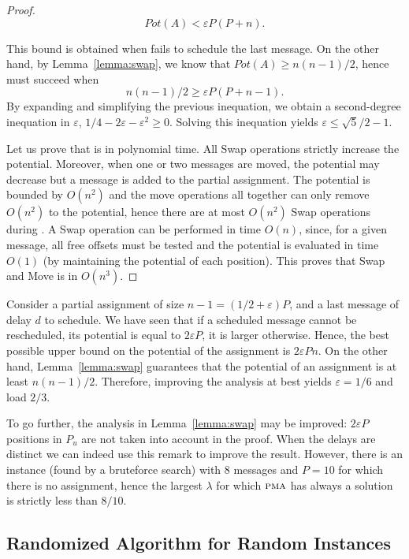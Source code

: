 \documentclass[pdflatex,sn-mathphys,iicol]{sn-jnl}%
\theoremstyle{thmstyleone}%
\theoremstyle{thmstyletwo}%
\theoremstyle{thmstylethree}%
\begin{document}
\begin{proof}
$$  Pot(A) < \varepsilon P (P + n).$$

This bound is obtained when \swapandmove fails to schedule the last message.
On the other hand, by Lemma~\ref{lemma:swap}, we know that $Pot(A) \geq n(n-1)/2$, hence 
\swapandmove must succeed when
$$n(n-1)/2 \geq  \varepsilon P (P + n -1).$$
By expanding and simplifying the previous inequation, we obtain a second-degree inequation in $\varepsilon$, $1/4 - 2\varepsilon - \varepsilon ^2 \geq  0$.
Solving this inequation yields $\varepsilon \leq \sqrt{5}/2 -1$.


Let us prove that \swapandmove is in polynomial time. All Swap operations 
strictly increase the potential. Moreover, when one or two messages are moved, the potential may decrease but a message is added to the partial assignment. The potential is bounded by $O(n^2)$ and the move operations all together can only remove $O(n^2)$ to the potential, hence there are at most $O(n^2)$ Swap operations during \swapandmove. A Swap operation can be performed in time $O(n)$, since, for a given message, all free offsets must be tested and the potential is evaluated in time $O(1)$ (by maintaining the potential of each position). This proves that Swap and Move is in $O(n^3)$.  
\end{proof}

Consider a partial assignment of size $n-1 = (1/2 + \varepsilon)P$, and a last message of delay $d$ to schedule.
We have seen that if a scheduled message cannot be rescheduled, its potential is equal to $2\varepsilon P$, it is larger otherwise.
Hence, the best possible upper bound on the potential of the assignment is $2\varepsilon P n$. On the other hand, Lemma~\ref{lemma:swap} guarantees that the potential of an assignment is at least $n(n-1)/2$. Therefore, improving the analysis at best yields $\varepsilon = 1/6$ and load $2/3$.

To go further, the analysis in Lemma~\ref{lemma:swap} may be improved: $2\varepsilon P$ positions in $P_{u}$ are not taken into account in the proof. When the delays are distinct we can indeed use this remark to improve the result. However, there is an instance (found by a bruteforce search) with $8$ messages and $P=10$ for which there is no assignment, hence the largest $\lambda$ for which $\textsc{pma}$ has always a solution is strictly less than $8/10$. 

\subsection{Randomized Algorithm for Random Instances}
\end{document}
